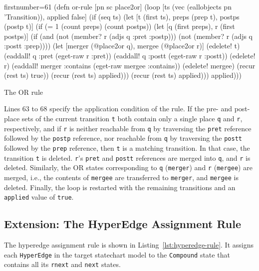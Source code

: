 \documentclass[11pt]{article}
\begin{document}
\begin{listing}[H]
  \begin{clojurecode*}{firstnumber=61}
(defn or-rule [pn sc place2or]
  (loop [ts (vec (eallobjects pn 'Transition)), applied false]
    (if (seq ts)
      (let [t (first ts), preps (prep t), postps (postp t)]
        (if (= 1 (count preps) (count postps))
          (let [q (first preps), r (first postps)]
            (if (and (not (member? r (adjs q :pret :postp)))
                     (not (member? r (adjs q :postt :prep))))
              (let [merger (@place2or q), mergee (@place2or r)]
                (edelete! t)
                (eaddall! q :pret  (eget-raw r :pret))
                (eaddall! q :postt (eget-raw r :postt))
                (edelete! r)
                (eaddall! merger :contains (eget-raw mergee :contains))
                (edelete! mergee)
                (recur (rest ts) true))
              (recur (rest ts) applied)))
          (recur (rest ts) applied)))
      applied)))
  \end{clojurecode*}
  \label{lst:or-rule}
  \caption{The OR rule}
\end{listing}

Lines 63 to 68 specify the application condition of the rule.  If the pre- and
post-place sets of the current transition \verb|t| both contain only a single
place \verb|q| and \verb|r|, respectively, and if \verb|r| is neither reachable
from \verb|q| by traversing the \verb|pret| reference followed by the
\verb|postp| reference, nor reachable from \verb|q| by traversing the
\verb|postt| followed by the \verb|prep| reference, then \verb|t| is a matching
transition.  In that case, the transition \verb|t| is deleted.  \verb|r|'s
\verb|pret| and \verb|postt| references are merged into \verb|q|, and \verb|r|
is deleted.  Similarly, the OR states corresponding to \verb|q| (\verb|merger|)
and \verb|r| (\verb|mergee|) are merged, i.e., the contents of \verb|mergee|
are transferred to \verb|merger|, and \verb|mergee| is deleted.  Finally, the
loop is restarted with the remaining transitions and an \verb|applied| value of
\verb|true|.



\subsection{Extension: The HyperEdge Assignment Rule}
\label{sec:hyperedge-rule}

The hyperedge assignment rule is shown in Listing~\ref{lst:hyperedge-rule}.  It
assigns each \verb|HyperEdge| in the target statechart model to the
\verb|Compound| state that contains all its \verb|rnext| and \verb|next|
states.
\end{document}
